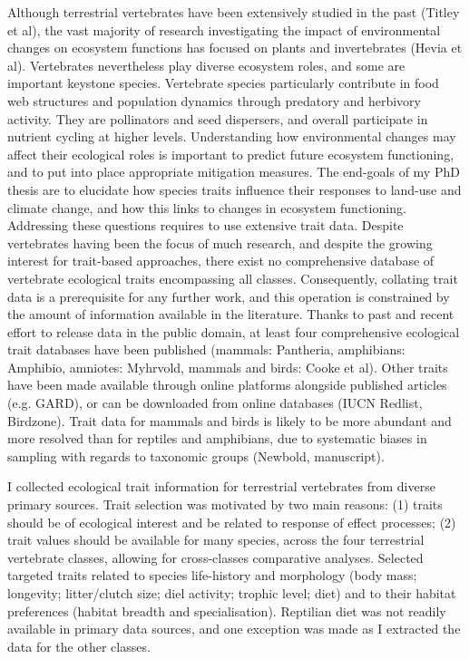 Although terrestrial vertebrates have been extensively studied in the past (Titley et al), the vast majority of research investigating the impact of environmental changes on ecosystem functions has focused on plants and invertebrates (Hevia et al). Vertebrates nevertheless play diverse ecosystem roles, and some are important keystone species.  Vertebrate species particularly contribute in food web structures and population dynamics through predatory and herbivory activity. They are pollinators and seed dispersers, and overall participate in nutrient cycling at higher levels. Understanding how environmental changes may affect their ecological roles is important to predict future ecosystem functioning, and to put into place appropriate mitigation measures. The end-goals of my PhD thesis are to elucidate how species traits influence their responses to land-use and climate change, and how this links to changes in ecosystem functioning. Addressing these questions requires to use extensive trait data.  Despite vertebrates having been the focus of much research, and despite the growing interest for trait-based approaches, there exist no comprehensive database of vertebrate ecological traits encompassing all classes. Consequently, collating trait data is a prerequisite for any further work, and this operation is constrained by the amount of information available in the literature. Thanks to past and recent effort to release data in the public domain, at least four comprehensive ecological trait databases have been published (mammals: Pantheria, amphibians: Amphibio, amniotes: Myhrvold, mammals and birds: Cooke et al). Other traits have been made available through online platforms alongside published articles (e.g. GARD), or can be downloaded from online databases (IUCN Redlist, Birdzone). Trait data for mammals and birds is likely to be more abundant and more resolved than for reptiles and amphibians, due to systematic biases in sampling with regards to taxonomic groups (Newbold, manuscript).
 
I collected ecological trait information for terrestrial vertebrates from diverse primary sources. Trait selection was motivated by two main reasons: (1) traits should be of ecological interest and be related to response of effect processes; (2) trait values should be available for many species, across the four terrestrial vertebrate classes, allowing for cross-classes comparative analyses. Selected targeted traits related to species life-history and morphology (body mass; longevity; litter/clutch size; diel activity; trophic level; diet) and to their habitat preferences (habitat breadth and specialisation). Reptilian diet was not readily available in primary data sources, and one exception was made as I extracted the data for the other classes.

